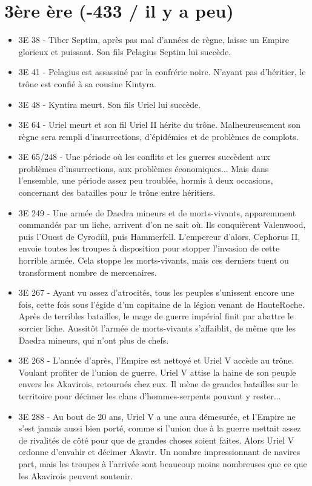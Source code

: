 \section{3ère ère (-433 / il y a peu)}

\begin{itemize}
\setlength{\leftmargin}{35pt}
\setlength{\itemsep}{20pt}
\item
3E 38 - Tiber Septim, après pas mal d'années de règne, laisse un Empire glorieux et puissant. Son fils Pelagius Septim lui succède.
\item
3E 41 - Pelagius est assassiné par la confrérie noire. N'ayant pas d'héritier, le trône est confié à sa cousine Kintyra.
\item
3E 48 - Kyntira meurt. Son fils Uriel lui succède.
\item
3E 64 - Uriel meurt et son fil Uriel II hérite du trône. Malheureusement son règne sera rempli d'insurrections, d'épidémies et de problèmes de complots.
\item
3E 65/248 - Une période où les conflits et les guerres succèdent aux problèmes d'insurrections, aux problèmes économiques... Mais dans l'ensemble, une période assez peu troublée, hormis à deux occasions, concernant des batailles pour le trône entre héritiers.
\item
3E 249 - Une armée de Daedra mineurs et de morts-vivants, apparemment commandés par un liche, arrivent d'on ne sait où. Ils conquièrent Valenwood, puis l'Ouest de Cyrodiil, puis Hammerfell. L'empereur d'alors, Cephorus II, envoie toutes les troupes à disposition pour stopper l'invasion de cette horrible armée. Cela stoppe les morts-vivants, mais ces derniers tuent ou transforment nombre de mercenaires.
\item
3E 267 - Ayant vu assez d'atrocités, tous les peuples s'unissent encore une fois, cette fois sous l'égide d'un capitaine de la légion venant de HauteRoche. Après de terribles batailles, le mage de guerre impérial finit par abattre le sorcier liche. Aussitôt l'armée de morts-vivants s'affaiblit, de même que les Daedra mineurs, qui n'ont plus de chefs.
\item
3E 268 - L'année d'après, l'Empire est nettoyé et Uriel V accède au trône. Voulant profiter de l'union de guerre, Uriel V attise la haine de son peuple envers les Akavirois, retournés chez eux. Il mène de grandes batailles sur le territoire pour décimer les clans d'hommes-serpents pouvant y rester...
\item 
3E 288 - Au bout de 20 ans, Uriel V a une aura démesurée, et l'Empire ne s'est jamais aussi bien porté, comme si l'union due à la guerre mettait assez de rivalités de côté pour que de grandes choses soient faites. Alors Uriel V ordonne d'envahir et décimer Akavir. Un nombre impressionnant de navires part, mais les troupes à l'arrivée sont beaucoup moins nombreuses que ce que les Akavirois peuvent soutenir. 

\end{itemize}
